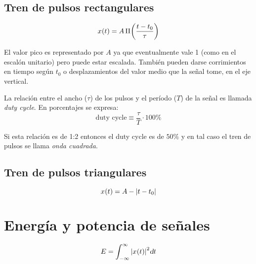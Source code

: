 \subsection{Tren de pulsos rectangulares}

\begin{equation*}
    \fx[x]{t} = A \, \pulse[t_0]{t}{\tau}
\end{equation*}

\begin{center}
    \def\svgwidth{0.8\linewidth}
    
\end{center}

El valor pico es representado por $A$ ya que eventualmente vale 1 (como en el escalón unitario) pero puede estar escalada.
También pueden darse corrimientos en tiempo según $t_0$ o desplazamientos del valor medio que la señal tome, en el eje vertical.

La relación entre el ancho ($\tau$) de los pulsos y el período ($T$) de la señal es llamada \emph{duty cycle}.
En porcentajes se expresa:
\begin{equation*}
    \text{duty cycle}  \equiv \frac{\tau}{T} \cdot 100\%
\end{equation*}

Si esta relación es de 1:2 entonces el duty cycle es de $50\%$ y en tal caso el tren de pulsos se llama \emph{onda cuadrada}.

\subsection{Tren de pulsos triangulares}

\begin{equation*}
    \fx[x]{t} = A - \norm{t-t_0}
\end{equation*}

\begin{center}
    \def\svgwidth{0.8\linewidth}
    
\end{center}

\section{Energía y potencia de señales}

\begin{mdframed}[style=DefinitionFrame]
    \begin{defn}
    \end{defn}
    \begin{equation*}
        E = \int_{-\infty}^{\infty} \norm{\fx[x]{t}}^2 \dif t
    \end{equation*}
\end{mdframed}

